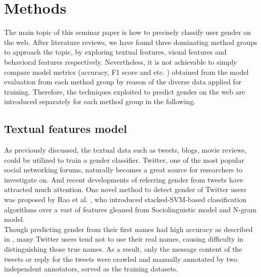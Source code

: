 \documentclass[runningheads]{llncs}
\begin{document}
	\section{Methods}
	
	The main topic of this seminar paper is how to precisely classify user gender on the web. After literature reviews, we have found three dominating method groups to approach the topic, by exploring textual features, visual features and behavioral features respectively. Nevertheless, it is not achievable to simply compare model metrics (accuracy, F1 score and etc. ) obtained from the model evaluation from each method group by reason of the diverse data applied for training. Therefore, the techniques exploited to predict gender on the web are introduced separately for each method group in the following. 
	
	\subsection{Textual features model}
	
	As previously discussed, the textual data such as tweets, blogs, movie reviews, could be utilized to train a gender classifier. Twitter, one of the most popular social networking forums, naturally becomes a great source for researchers to investigate on. And recent developments of referring gender from tweets have attracted much attention. One novel method to detect gender of Twitter users was proposed by Rao et al. \cite{rao2010classifying}, who introduced stacked-SVM-based classification algorithms over a vast of features gleaned from Sociolinguistic model and N-gram model.  \\
	
	Though predicting gender from their first names had high accuracy as described in \cite{karimi2016inferring}, many Twitter users tend not to use their real names, causing difficulty in distinguishing those true names. As a result, only the message content of the tweets or reply for the tweets were crawled and manually annotated by two independent annotators, served as the training datasets.  \\
	
\end{document}
